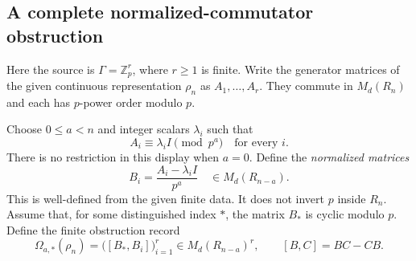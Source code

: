 \subsection{A complete normalized-commutator obstruction}

Here the source is $\Gamma=\mathbb Z_p^r$, where $r\geq1$ is finite. Write the generator matrices of the given continuous representation $\rho_n$ as $A_1,\ldots,A_r$. They commute in $M_d(R_n)$ and each has $p$-power order modulo $p$.

Choose $0\leq a<n$ and integer scalars $\lambda_i$ such that
\[
 A_i\equiv\lambda_i I\pmod{p^a}\quad\text{for every }i.
\]
There is no restriction in this display when $a=0$. Define the \emph{normalized matrices}
\[
 B_i=\frac{A_i-\lambda_i I}{p^a}
 \quad\in M_d(R_{n-a}).
\]
This is well-defined from the given finite data. It does not invert $p$ inside $R_n$. Assume that, for some distinguished index $*$, the matrix $B_*$ is cyclic modulo $p$. Define the finite obstruction record
\[
 \boxed{\Omega_{a,*}(\rho_n)=
 \bigl([B_*,B_i]\bigr)_{i=1}^r\in M_d(R_{n-a})^r,}
 \qquad [B,C]=BC-CB.
\]

